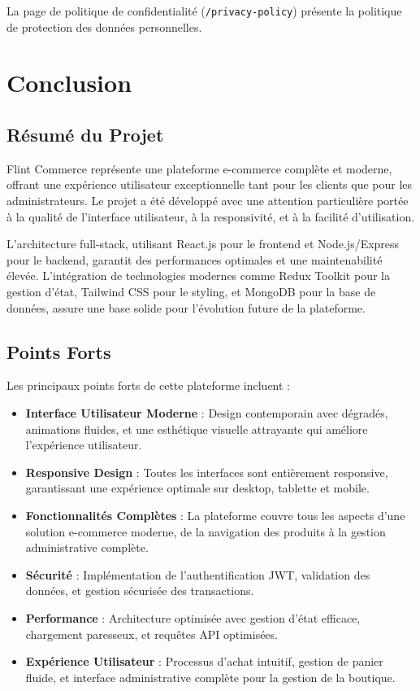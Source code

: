 \documentclass[12pt,a4paper]{article}
\begin{document}
La page de politique de confidentialité (\texttt{/privacy-policy}) présente la politique de protection des données personnelles.

\newpage

\section{Conclusion}

\subsection{Résumé du Projet}

Flint Commerce représente une plateforme e-commerce complète et moderne, offrant une expérience utilisateur exceptionnelle tant pour les clients que pour les administrateurs. Le projet a été développé avec une attention particulière portée à la qualité de l'interface utilisateur, à la responsivité, et à la facilité d'utilisation.

L'architecture full-stack, utilisant React.js pour le frontend et Node.js/Express pour le backend, garantit des performances optimales et une maintenabilité élevée. L'intégration de technologies modernes comme Redux Toolkit pour la gestion d'état, Tailwind CSS pour le styling, et MongoDB pour la base de données, assure une base solide pour l'évolution future de la plateforme.

\subsection{Points Forts}

Les principaux points forts de cette plateforme incluent :

\begin{itemize}
    \item \textbf{Interface Utilisateur Moderne} : Design contemporain avec dégradés, animations fluides, et une esthétique visuelle attrayante qui améliore l'expérience utilisateur.
    
    \item \textbf{Responsive Design} : Toutes les interfaces sont entièrement responsive, garantissant une expérience optimale sur desktop, tablette et mobile.
    
    \item \textbf{Fonctionnalités Complètes} : La plateforme couvre tous les aspects d'une solution e-commerce moderne, de la navigation des produits à la gestion administrative complète.
    
    \item \textbf{Sécurité} : Implémentation de l'authentification JWT, validation des données, et gestion sécurisée des transactions.
    
    \item \textbf{Performance} : Architecture optimisée avec gestion d'état efficace, chargement paresseux, et requêtes API optimisées.
    
    \item \textbf{Expérience Utilisateur} : Processus d'achat intuitif, gestion de panier fluide, et interface administrative complète pour la gestion de la boutique.
\end{itemize}
\end{document}
